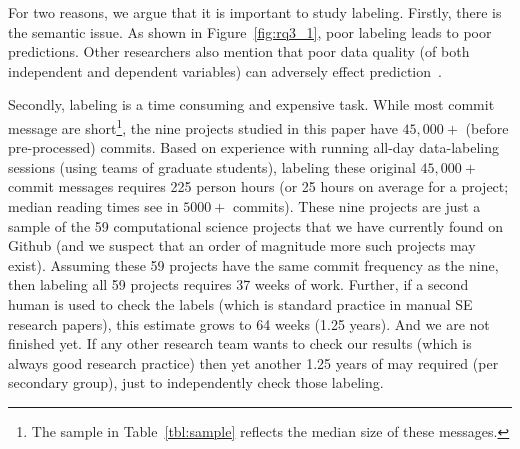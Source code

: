 \documentclass[10pt,journal,compsoc]{IEEEtran}
\newcommand{\fig}[1]{Figure~\ref{fig:#1}}
\newcommand{\tbl}[1]{Table~\ref{tbl:#1}}
\begin{document}
For two reasons, we argue that it is important to study labeling. 
Firstly, there is the semantic issue.
As shown in \fig{rq3_1}, poor labeling leads to poor predictions. Other researchers also mention
that poor data quality (of both independent and dependent variables) can adversely effect prediction~\cite{herzig13_misclassifications,bird09_bias}.

Secondly,
labeling is a time consuming and expensive task. While most commit message are short\footnote{The sample  in \tbl{sample} reflects the median size of these messages.},   the  nine projects studied in this paper   have $45,000+$ (before  pre-processed) commits. Based on experience with running all-day data-labeling sessions (using  teams of graduate students), labeling these original $45,000+$ commit messages requires 225 person hours (or 25 hours on average for a project; median reading
times see in $5000+$ commits).  These nine projects are just a sample of the 59 computational science projects that
we have currently found on Github (and we suspect that an order of magnitude more such projects may exist).
Assuming these 59 projects have the same commit frequency as the nine, then labeling all 59 projects requires 37 weeks of work. Further,  if a second human is used to check the labels (which is standard practice
in manual SE research papers),  this estimate grows to 64 weeks (1.25 years).  And we are not finished yet. If any other research team wants to check our results (which is always good research practice) then yet another 1.25 years of may required (per secondary group), just to independently check those labeling.  


\end{document}
